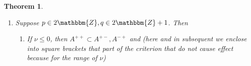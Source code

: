 \documentclass[12pt]{msjproc} %
\newcommand{\tmop}[1]{\ensuremath{\operatorname{#1}}}
\newtheorem{theorem}{Theorem}
\theoremstyle{definition}
\theoremstyle{exampstyle} \newtheorem{examp}[theorem]{Theorem}
\begin{document}
\begin{versiona}
\begin{theorem}
\begin{enumerate}
\begin{enumerate}
      \
      
      \item If $\nu > p + q - 3$, then $A^{+ -} \subset A^{- -}$ and
      
      \begin{center}
        \begin{center}
          \begin{center}
            \begin{center}
              \begin{tabular}{|c|c|c|}
                \hline
                & $\nu \in 2\mathbbm{Z}$ & $\nu \in 2\mathbbm{Z}+ 1$\\
                \hline
                $(/ / \cup \backslash\backslash)^c$ & $\tmop{full}$ & $A^{+
                -}$\\
                \hline
                $\backslash\backslash - / /$ & $A^{- +}$ & $A^{+ -}$\\
                \hline
                $/ / -\backslash\backslash$ & $\tmop{full}$ & $\varnothing$\\
                \hline
              \end{tabular}
            \end{center}
          \end{center}
        \end{center}
      \end{center}
      
      \ 
    \end{enumerate}
    \item Suppose $p \in 2\mathbbm{Z}, q \in 2\mathbbm{Z}+ 1$. Then
    \begin{enumerate}
      \item If $\nu \leqslant 0$, then $A^{+ +} \subset A^{+ -}, A^{- +}$ and
      (here and in subsequent we enclose into square brackets that part of the
      criterion that do not cause effect because for the range of $\nu$)
      

\end{enumerate}
\end{enumerate}
\end{theorem}
\end{versiona}
\end{document}
